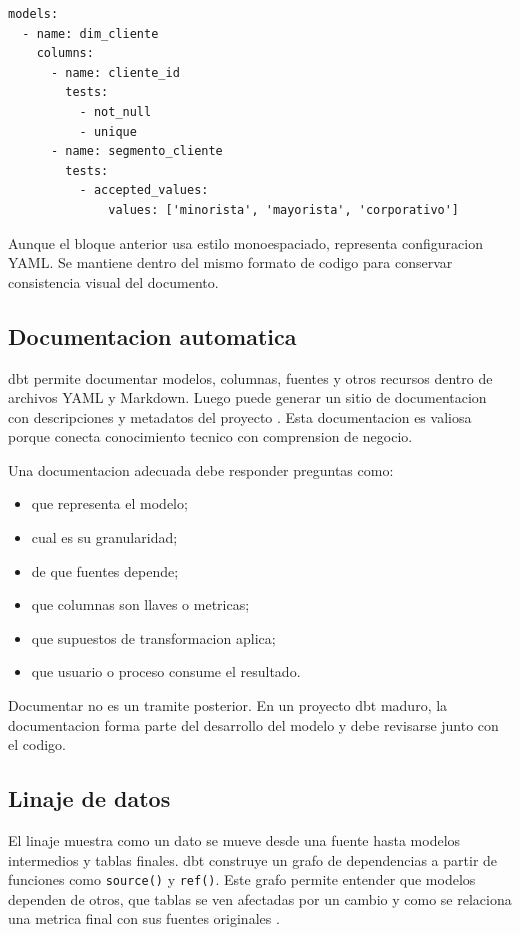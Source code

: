 \documentclass[12pt]{article}
\begin{document}
\begin{lstlisting}[style=sql, caption={Ejemplo conceptual de pruebas declaradas en YAML}]
models:
  - name: dim_cliente
    columns:
      - name: cliente_id
        tests:
          - not_null
          - unique
      - name: segmento_cliente
        tests:
          - accepted_values:
              values: ['minorista', 'mayorista', 'corporativo']
\end{lstlisting}

Aunque el bloque anterior usa estilo monoespaciado, representa configuracion YAML. Se mantiene dentro del mismo formato de codigo para conservar consistencia visual del documento.

\subsection{Documentacion automatica}
dbt permite documentar modelos, columnas, fuentes y otros recursos dentro de archivos YAML y Markdown. Luego puede generar un sitio de documentacion con descripciones y metadatos del proyecto \cite{dbt_docs}. Esta documentacion es valiosa porque conecta conocimiento tecnico con comprension de negocio.

Una documentacion adecuada debe responder preguntas como:

\begin{itemize}[leftmargin=*]
\item que representa el modelo;
\item cual es su granularidad;
\item de que fuentes depende;
\item que columnas son llaves o metricas;
\item que supuestos de transformacion aplica;
\item que usuario o proceso consume el resultado.
\end{itemize}

Documentar no es un tramite posterior. En un proyecto dbt maduro, la documentacion forma parte del desarrollo del modelo y debe revisarse junto con el codigo.

\subsection{Linaje de datos}
El linaje muestra como un dato se mueve desde una fuente hasta modelos intermedios y tablas finales. dbt construye un grafo de dependencias a partir de funciones como \texttt{source()} y \texttt{ref()}. Este grafo permite entender que modelos dependen de otros, que tablas se ven afectadas por un cambio y como se relaciona una metrica final con sus fuentes originales \cite{dbt_lineage}.
\end{document}
